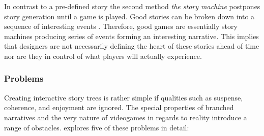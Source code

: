 In contrast to a pre-defined story the second method \textit{the story machine} postpones story generation until a game is played.
Good stories can be broken down into a sequence of interesting events \cite{Schell2014}.
Therefore, good games are essentially story machines producing series of events forming an interesting narrative.
This implies that designers are not necessarily defining the heart of these stories ahead of time nor are they in control of what players will actually experience.


\subsubsection{Problems} \label{sec:story-problems}
Creating interactive story trees is rather simple if qualities such as suspense, coherence, and enjoyment are ignored.
The special properties of branched narratives and the very nature of videogames in regards to reality introduce a range of obstacles.
\citeauthor{Schell2014} explores five of these problems in detail:

